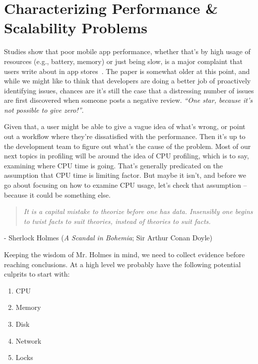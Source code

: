 




\section*{Characterizing Performance \& Scalability Problems}

Studies show that poor mobile app performance, whether that's by high usage of resources (e.g., battery, memory) or just being slow, is a major complaint that users write about in app stores~\cite{free-apps}. The paper is somewhat older at this point, and while we might like to think that developers are doing a better job of proactively identifying issues, chances are it's still the case that a distressing number of issues are first discovered when someone posts a negative review. \textit{``One star, because it's not possible to give zero!''}.

Given that, a user might be able to give a vague idea of what's wrong, or point out a workflow where they're dissatisfied with the performance. Then it's up to the development team to figure out what's the cause of the problem. Most of our next topics in profiling will be around the idea of CPU profiling, which is to say, examining where CPU time is going. That's generally predicated on the assumption that CPU time is limiting factor. But maybe it isn't, and before we go about focusing on how to examine CPU usage, let's check that assumption -- because it could be something else.

\begin{quote}
\textit{It is a capital mistake to theorize before one has data. Insensibly one begins to twist facts to suit theories, instead of theories to suit facts.}
\end{quote}
\hfill - Sherlock Holmes (\textit{A Scandal in Bohemia}; Sir Arthur Conan Doyle)

Keeping the wisdom of Mr. Holmes in mind, we need to collect evidence before reaching conclusions. At a high level we probably have the following potential culprits to start with:
\begin{enumerate}
	\item CPU
	\item Memory
	\item Disk
	\item Network
	\item Locks
\end{enumerate}

